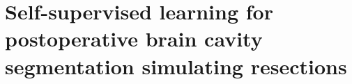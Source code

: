 \chapter[Self-supervised learning for cavity segmentation]{Self-supervised learning for postoperative brain cavity segmentation simulating resections}

\label{chap:resection}
\minitoc
